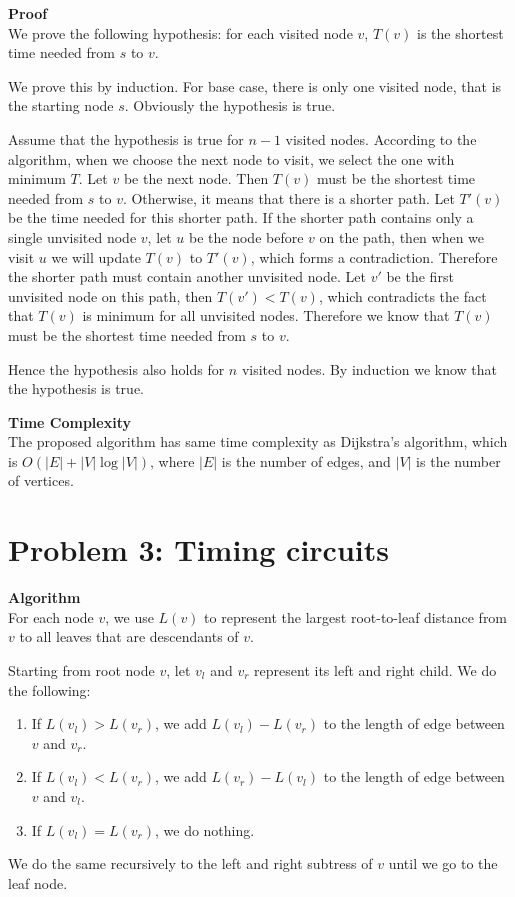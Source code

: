 \documentclass{article}
\newcommand{\Complexity}{\vspace{0.3cm} \noindent\textbf{Time Complexity} \\}
\newcommand{\Proof}{\vspace{0.3cm} \noindent\textbf{Proof} \\}
\newcommand{\Algorithm}{\textbf{Algorithm} \\}
\begin{document}
\Proof
We prove the following hypothesis: for each visited node $v$, $T(v)$ is the shortest time needed from $s$ to
$v$. 

We prove this by induction.
For base case, there is only one visited node, that is the starting node $s$. Obviously the
hypothesis is true.

Assume that the hypothesis is true for $n-1$ visited nodes. According to the algorithm, when we
choose the next node to visit, we select the one with minimum $T$. 
Let $v$ be the next node. Then $T(v)$ must be the shortest time needed from 
$s$ to $v$. 
Otherwise, it means that there is a shorter path. Let $T'(v)$ be the time needed for this shorter
path. 
If the shorter path contains only a single unvisited node $v$, let $u$ be the node before $v$ on the path,
then when we visit $u$ we will update $T(v)$ to $T'(v)$, which forms a contradiction.
Therefore the shorter path must contain another unvisited node.
Let $v'$ be the first unvisited node on this path, then $T(v') < T(v)$, which
contradicts the fact that $T(v)$ is minimum for all unvisited nodes. Therefore we know that 
$T(v)$ must be the shortest time needed from $s$ to $v$.

Hence the hypothesis also holds for $n$ visited nodes. By induction we know that the hypothesis is
true.

\Complexity
The proposed algorithm has same time complexity as Dijkstra's algorithm, which is $O(|E| +
|V|\log|V|)$, where $|E|$ is the number of edges, and $|V|$ is the number of vertices.

\section*{Problem 3: Timing circuits}
\Algorithm
For each node $v$, we use $L(v)$ to represent the largest root-to-leaf distance from $v$ to 
all leaves that are descendants of $v$.

Starting from root node $v$, let $v_{l}$ and $v_{r}$ represent its left and right child. We do the
following:
\begin{enumerate}
  \item If $L(v_l) > L(v_r)$, we add $L(v_l) - L(v_r)$ to the length of edge between $v$ and $v_r$.
  \item If $L(v_l) < L(v_r)$, we add $L(v_r) - L(v_l)$ to the length of edge between $v$ and $v_l$.
  \item If $L(v_l) = L(v_r)$, we do nothing.
\end{enumerate}
We do the same recursively to the left and right subtress of $v$ until we go to the leaf node.
\end{document}
